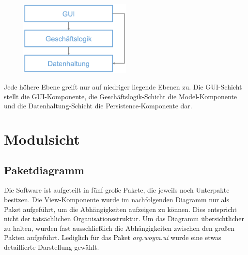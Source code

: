 \documentclass[fontsize=12pt,paper=a4,twoside]{scrartcl}
\begin{document}
\begin{figure}[H]
\centering
\includegraphics[width=0.5\textwidth]{schichten.pdf}
\end{figure}

Jede höhere Ebene greift nur auf niedriger liegende Ebenen zu. Die GUI-Schicht stellt die GUI-Komponente, die Geschäftslogik-Schicht die Model-Komponente und die Datenhaltung-Schicht die Persistence-Komponente dar.

\clearpage

\section{Modulsicht}
\label{sec:modulsicht}

\subsection{Paketdiagramm}
Die Software ist aufgeteilt in fünf große Pakete, die jeweils noch Unterpakte besitzen. Die View-Komponente wurde im nachfolgenden Diagramm nur als Paket aufgeführt, um die Abhängigkeiten aufzeigen zu können. Dies entspricht nicht der tatsächlichen Organisationsstruktur. Um das Diagramm übersichtlicher zu halten, wurden fast ausschließlich die Abhängigkeiten zwischen den großen Pakten aufgeführt. Lediglich für das Paket \textit{org.woym.ui} wurde eine etwas detaillierte Darstellung gewählt.
\end{document}
